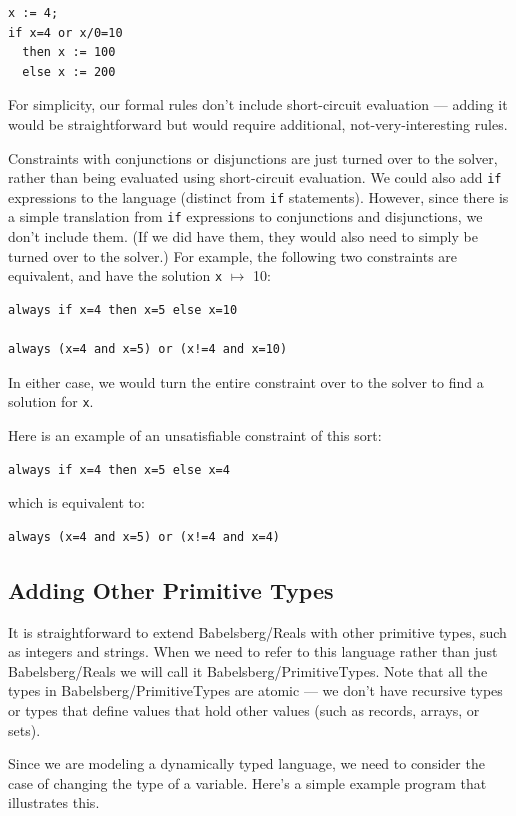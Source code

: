 \documentclass{article}
\begin{document}
\begin{verbatim}
x := 4;
if x=4 or x/0=10
  then x := 100
  else x := 200
\end{verbatim}

For simplicity, our formal rules don't include short-circuit
evaluation --- adding it would be straightforward but would require
additional, not-very-interesting rules.

Constraints with conjunctions or disjunctions are
just turned over to the solver, rather than being evaluated using
short-circuit evaluation.  We could also add \verb|if| expressions to
the language (distinct from \verb|if| statements).  However, since
there is a simple translation from \verb|if| expressions to
conjunctions and disjunctions, we don't include them.  (If we did have
them, they would also need to simply be turned over to the solver.)
For example, the following two constraints are equivalent, and have 
the solution \verb|x| $\mapsto$ 10:

\begin{verbatim}
always if x=4 then x=5 else x=10

always (x=4 and x=5) or (x!=4 and x=10)
\end{verbatim}

In either case, we would turn the entire constraint over to the solver
to find a solution for \verb|x|.

Here is an example of an unsatisfiable constraint of this sort:
\begin{verbatim}
always if x=4 then x=5 else x=4
\end{verbatim}
which is equivalent to:
\begin{verbatim}
always (x=4 and x=5) or (x!=4 and x=4)
\end{verbatim}

\subsection{Adding Other Primitive Types}

It is straightforward to extend Babelsberg/Reals with other primitive
types, such as integers and strings.  When we need to refer to
this language rather than just Babelsberg/Reals we will call it
Babelsberg/PrimitiveTypes.  Note that all the types in
Babelsberg/PrimitiveTypes are atomic --- we don't have recursive types
or types that define values that hold other values (such as records,
arrays, or sets). 

Since we are modeling a dynamically typed language, we need to
consider the case of changing the type of a variable.  Here's a simple
example program that illustrates this.
\end{document}
